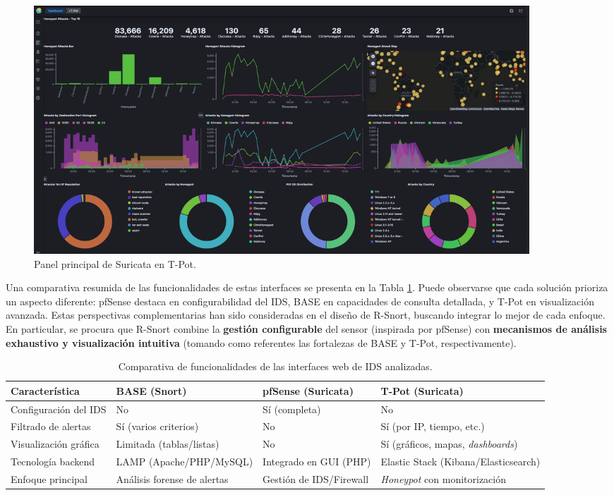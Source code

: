 \documentclass[11pt,a4paper,twoside]{report}
\begin{document}
\begin{figure}[hbtp]
	\centering
	\includegraphics[width=0.9\textwidth]{documento/3.png}
	\caption{Panel principal de Suricata en T-Pot.}
	\label{fig:tpot-dashboard}
\end{figure}

\vspace{1em}
\noindent Una comparativa resumida de las funcionalidades de estas interfaces se presenta en la Tabla \ref{tab:comparativa-interfaces}. Puede observarse que cada solución prioriza un aspecto diferente: pfSense destaca en configurabilidad del IDS, BASE en capacidades de consulta detallada, y T-Pot en visualización avanzada. Estas perspectivas complementarias han sido consideradas en el diseño de R-Snort, buscando integrar lo mejor de cada enfoque. En particular, se procura que R-Snort combine la \textbf{gestión configurable} del sensor (inspirada por pfSense) con \textbf{mecanismos de análisis exhaustivo y visualización intuitiva} (tomando como referentes las fortalezas de BASE y T-Pot, respectivamente).

\begin{table}[hbtp]
	\centering
	\renewcommand{\arraystretch}{1.6}
	\setlength{\tabcolsep}{8pt} %
	\begin{tabularx}{\textwidth}{|>{\centering\arraybackslash}X 
			|>{\centering\arraybackslash}X 
			|>{\centering\arraybackslash}X 
			|>{\centering\arraybackslash}X|}
		\hline
		\textbf{Característica} & \textbf{BASE (Snort)} & \textbf{pfSense (Suricata)} & \textbf{T-Pot (Suricata)} \\
		\hline
		Configuración del IDS & No & Sí (completa) & No \\
		\hline
		Filtrado de alertas & Sí (varios criterios) & No & Sí (por IP, tiempo, etc.) \\
		\hline
		Visualización gráfica & Limitada (tablas/listas) & No & Sí (gráficos, mapas, \emph{dashboards}) \\
		\hline
		Tecnología backend & LAMP (Apache/PHP/MySQL) & Integrado en GUI (PHP) & Elastic Stack (Kibana/Elasticsearch) \\
		\hline
		Enfoque principal & Análisis forense de alertas & Gestión de IDS/Firewall & \emph{Honeypot} con monitorización \\
		\hline
	\end{tabularx}
	\caption{Comparativa de funcionalidades de las interfaces web de IDS analizadas.}
	\label{tab:comparativa-interfaces}
\end{table}
\end{document}
